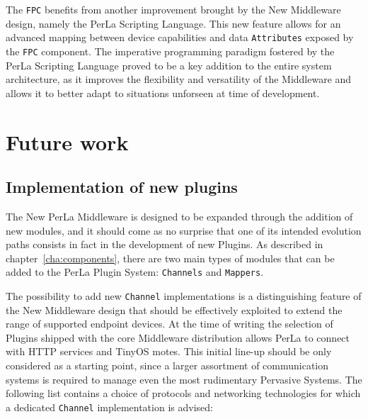 The \texttt{FPC} benefits from another improvement brought by the New
Middleware design, namely the PerLa Scripting Language. This new feature allows
for an advanced mapping between device capabilities and data
\texttt{Attributes} exposed by the \texttt{FPC} component. The imperative
programming paradigm fostered by the PerLa Scripting Language proved to be a
key addition to the entire system architecture, as it improves the flexibility
and versatility of the Middleware and allows it to better adapt to situations
unforseen at time of development.


\section{Future work}

\subsection{Implementation of new plugins}

The New PerLa Middleware is designed to be expanded through the addition of new
modules, and it should come as no surprise that one of its intended evolution
paths consists in fact in the development of new Plugins. As described in
chapter~\ref{cha:components}, there are two main types of modules that can be
added to the PerLa Plugin System: \texttt{Channels} and \texttt{Mappers}.

The possibility to add new \texttt{Channel} implementations is a distinguishing
feature of the New Middleware design that should be effectively exploited to
extend the range of supported endpoint devices. At the time of writing the
selection of Plugins shipped with the core Middleware distribution allows PerLa
to connect with HTTP services and TinyOS motes. This initial line-up should be
only considered as a starting point, since a larger assortment of communication
systems is required to manage even the most rudimentary Pervasive Systems. The
following list contains a choice of protocols and networking technologies for
which a dedicated \texttt{Channel} implementation is advised:

